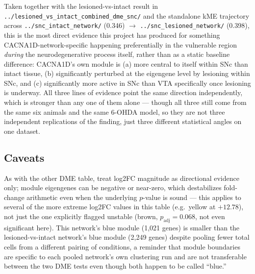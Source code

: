 \documentclass[11pt]{article}
\begin{document}
Taken together with the lesioned-vs-intact result in
\texttt{../lesioned\_vs\_intact\_combined\_dme\_snc/} and the standalone
kME trajectory across \texttt{../snc\_intact\_network/} (0.346) $\to$
\texttt{../snc\_lesioned\_network/} (0.398), this is the most direct
evidence this project has produced for something CACNA1D-network-specific
happening preferentially in the vulnerable region \emph{during} the
neurodegenerative process itself, rather than as a static baseline
difference: CACNA1D's own module is (a) more central to itself within SNc
than intact tissue, (b) significantly perturbed at the eigengene level by
lesioning within SNc, and (c) significantly more active in SNc than VTA
specifically once lesioning is underway. All three lines of evidence point
the same direction independently, which is stronger than any one of them
alone --- though all three still come from the same six animals and the
same 6-OHDA model, so they are not three independent replications of the
finding, just three different statistical angles on one dataset.

\subsection*{Caveats}

As with the other DME table, treat log2FC magnitude as directional evidence
only; module eigengenes can be negative or near-zero, which destabilizes
fold-change arithmetic even when the underlying $p$-value is sound --- this
applies to several of the more extreme log2FC values in this table (e.g.\
yellow at $+12.78$), not just the one explicitly flagged unstable (brown,
$p_{\mathrm{adj}}=0.068$, not even significant here). This network's blue
module (1{,}021 genes) is smaller than the lesioned-vs-intact network's
blue module (2{,}249 genes) despite pooling fewer total cells from a
different pairing of conditions, a reminder that module boundaries are
specific to each pooled network's own clustering run and are not
transferable between the two DME tests even though both happen to be
called ``blue.''
\end{document}
